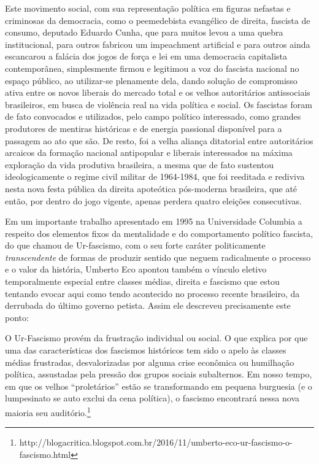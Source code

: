 Este movimento social, com sua representação política em figuras
nefastas e criminosas da democracia, como o peemedebista evangélico de
direita, fascista de consumo, deputado Eduardo Cunha, que para muitos
levou a uma quebra institucional, para outros fabricou um impeachment
artificial e para outros ainda escancarou a falácia dos jogos de força e
lei em uma democracia capitalista contemporânea, simplesmente firmou e
legitimou a voz do fascista nacional no espaço público, ao utilizar-se
plenamente dela, dando solução de compromisso ativa entre os novos
liberais do mercado total e os velhos autoritários antissociais
brasileiros, em busca de violência real na vida política e social. Os
fascistas foram de fato convocados e utilizados, pelo campo político
interessado, como grandes produtores de mentiras históricas e de energia
passional disponível para a passagem ao ato que são. De resto, foi a
velha aliança ditatorial entre autoritários arcaicos da formação
nacional antipopular e liberais interessados na máxima exploração da
vida produtiva brasileira, a mesma que de fato sustentou ideologicamente
o regime civil militar de 1964-1984, que foi reeditada e rediviva nesta
nova festa pública da direita apoteótica pós-moderna brasileira, que até
então, por dentro do jogo vigente, apenas perdera quatro eleições
consecutivas.

Em um importante trabalho apresentado em 1995 na Universidade Columbia a
respeito dos elementos fixos da mentalidade e do comportamento político
fascista, do que chamou de Ur-fascismo, com o seu forte caráter
politicamente \emph{transcendente} de formas de produzir sentido que
neguem radicalmente o processo e o valor da história, Umberto Eco
apontou também o vínculo eletivo temporalmente especial entre classes
médias, direita e fascismo que estou tentando evocar aqui como tendo
acontecido no processo recente brasileiro, da derrubada do último
governo petista. Assim ele descreveu precisamente este ponto:

O Ur-Fascismo provém da frustração individual ou social. O que explica
por que uma das características dos fascismos históricos tem sido o
apelo às classes médias frustradas, desvalorizadas por alguma crise
econômica ou humilhação política, assustadas pela pressão dos grupos
sociais subalternos. Em nosso tempo, em que os velhos ``proletários''
estão se transformando em pequena burguesia (e o lumpesinato se auto
exclui da cena política), o fascismo encontrará nessa nova maioria seu
auditório.\footnote{http://blogacritica.blogspot.com.br/2016/11/umberto-eco-ur-fascismo-o-fascismo.html}

